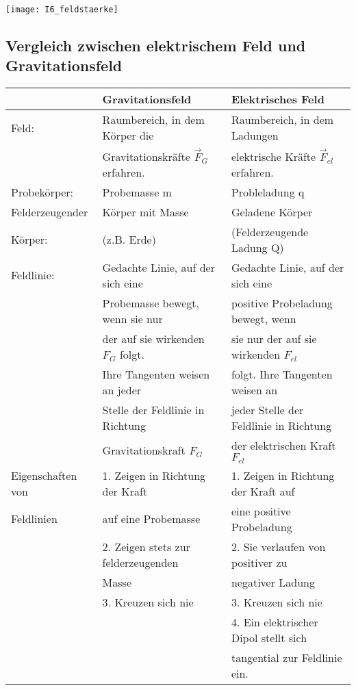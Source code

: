 \documentclass[12pt]{scrartcl}
\begin{document}
\begin{flushleft}
		\vspace{2mm}
		\texttt{[image: I6\_feldstaerke]}
		
		\vspace{10mm}
		
		\subsection{Vergleich zwischen elektrischem Feld und Gravitationsfeld}
		\begin{tabular}{|l|l|l|}
			
			\hline & Gravitationsfeld & Elektrisches Feld\\
			\hline Feld: & Raumbereich, in dem Körper die &   Raumbereich, in dem Ladungen\\
		 & Gravitationskräfte $ \vec{F}_{G} $ erfahren.& elektrische Kräfte $ \vec{F}_{el} $ erfahren. \\
			\hline Probekörper: & Probemasse m & Probleladung q \\
			\hline Felderzeugender & Körper mit Masse & Geladene Körper \\
			Körper: & (z.B. Erde) & (Felderzeugende Ladung Q) \\
			\hline Feldlinie: & Gedachte Linie, auf der sich eine & Gedachte Linie, auf der sich eine \\
			& Probemasse bewegt, wenn sie nur & positive Probeladung bewegt, wenn \\
			& der auf sie wirkenden $ F_{G} $ folgt. & sie nur der auf sie wirkenden $ F_{el} $ \\
			& Ihre Tangenten weisen an jeder & folgt. Ihre Tangenten  weisen an \\
			& Stelle der Feldlinie in Richtung & jeder Stelle der Feldlinie in Richtung \\
			& Gravitationskraft $ F_{G} $ & der elektrischen Kraft $ F_{el} $ \\
			\hline Eigenschaften von & 1. Zeigen in Richtung der Kraft & 1. Zeigen in Richtung der Kraft auf \\
			Feldlinien & auf eine Probemasse & eine positive Probeladung \\
			& 2. Zeigen stets zur felderzeugenden & 2. Sie verlaufen von positiver zu \\
			& Masse & negativer Ladung \\
			& 3. Kreuzen sich nie & 3. Kreuzen sich nie \\
			& & 4. Ein elektrischer Dipol stellt sich \\
			& & tangential zur Feldlinie ein. \\

\end{tabular}
\end{flushleft}
\end{document}
